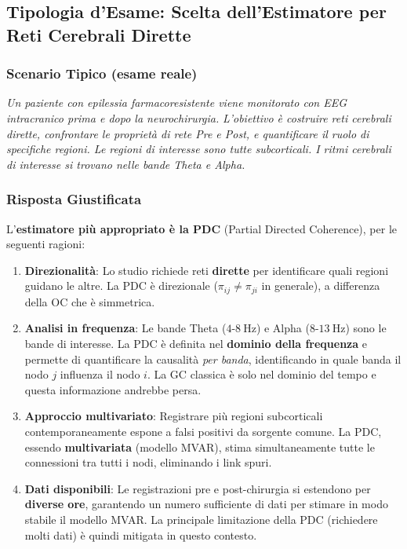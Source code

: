 \documentclass[10pt, letterpaper]{report}
\begin{document}
\subsection{Tipologia d'Esame: Scelta dell'Estimatore per Reti Cerebrali Dirette}

\subsubsection*{Scenario Tipico (esame reale)}
\emph{Un paziente con epilessia farmacoresistente viene monitorato con EEG intracranico prima e dopo la neurochirurgia.}
\emph{L'obiettivo è costruire reti cerebrali dirette, confrontare le proprietà di rete Pre e Post,
e quantificare il ruolo di specifiche regioni.
Le regioni di interesse sono tutte subcorticali.
I ritmi cerebrali di interesse si trovano nelle bande Theta e Alpha.}

\subsubsection*{Risposta Giustificata}
L'\textbf{estimatore più appropriato è la PDC} (Partial Directed Coherence), per le seguenti ragioni:

\begin{enumerate}
    \item \textbf{Direzionalità}: Lo studio richiede reti \textbf{dirette} per identificare quali regioni guidano le altre.
    La PDC è direzionale ($\pi_{ij} \neq \pi_{ji}$ in generale), a differenza della OC che è simmetrica.

    \item \textbf{Analisi in frequenza}: Le bande Theta ($4$-$8\ \text{Hz}$) e Alpha ($8$-$13\ \text{Hz}$) sono le bande di interesse.
    La PDC è definita nel \textbf{dominio della frequenza} e permette di quantificare la causalità \emph{per banda}, identificando in quale banda il nodo $j$ influenza il nodo $i$.
    La GC classica è solo nel dominio del tempo e questa informazione andrebbe persa.

    \item \textbf{Approccio multivariato}: Registrare più regioni subcorticali contemporaneamente espone a falsi positivi da sorgente comune.
    La PDC, essendo \textbf{multivariata} (modello MVAR), stima simultaneamente tutte le connessioni tra tutti i nodi, eliminando i link spuri.

    \item \textbf{Dati disponibili}: Le registrazioni pre e post-chirurgia si estendono per \textbf{diverse ore}, garantendo un numero sufficiente di dati per stimare in modo stabile il modello MVAR.
    La principale limitazione della PDC (richiedere molti dati) è quindi mitigata in questo contesto.
\end{enumerate}
\end{document}

